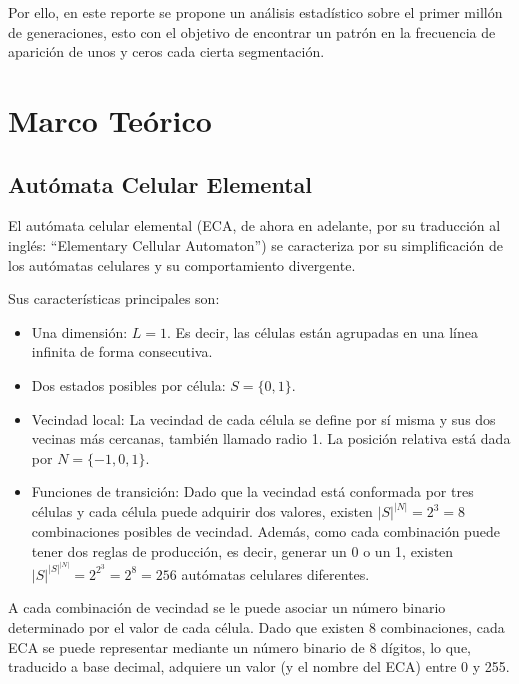 \documentclass[12pt,twoside]{article}
\begin{document}
	Por ello, en este reporte se propone un análisis estadístico sobre el primer millón de generaciones, esto con el objetivo de encontrar un patrón en la frecuencia de aparición de unos y ceros cada cierta segmentación.
	
	\clearpage
	\section{Marco Teórico}
	
	\subsection{Autómata Celular Elemental}
	
	El autómata celular elemental (ECA, de ahora en adelante, por su traducción al inglés: ``Elementary Cellular Automaton'') se caracteriza por su simplificación de los autómatas celulares y su comportamiento divergente.
	
	Sus características principales son:
	\begin{itemize}
		\item Una dimensión: $L = 1$. Es decir, las células están agrupadas en una línea infinita de forma consecutiva.
		
		\item Dos estados posibles por célula: $S = \{0, 1\}$.  
		
		\item Vecindad local: La vecindad de cada célula se define por sí misma y sus dos vecinas más cercanas, también llamado radio 1. La posición relativa está dada por $N = \{-1, 0, 1\}$.  
		
		\item Funciones de transición: Dado que la vecindad está conformada por tres células y cada célula puede adquirir dos valores, existen $|S|^{|N|} = 2^3 = 8$ combinaciones posibles de vecindad. Además, como cada combinación puede tener dos reglas de producción, es decir, generar un 0 o un 1, existen $|S|^{|S|^{|N|}} = 2^{2^3} = 2^8 = 256$ autómatas celulares diferentes.  
		
	\end{itemize}
	
	A cada combinación de vecindad se le puede asociar un número binario determinado por el valor de cada célula. Dado que existen 8 combinaciones, cada ECA se puede representar mediante un número binario de 8 dígitos, lo que, traducido a base decimal, adquiere un valor (y el nombre del ECA) entre 0 y 255.
	
\end{document}
